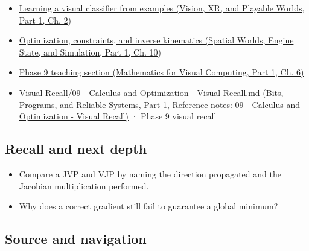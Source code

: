 \begin{itemize}
\tightlist
\item
  \href{../07-Vision-XR-and-Playable-Worlds-P01/main.pdf\#nameddest=04-visual-computing-ii-ch031-learning-a-visual-classifier-from-examples}{Learning a visual classifier from examples (Vision, XR, and Playable Worlds, Part 1, Ch. 2)}
\item
  \href{../05-Spatial-Worlds-Engine-State-and-Simulation-P01/main.pdf\#nameddest=04-visual-computing-ii-ch029-optimization-constraints-and-inverse-kinematics}{Optimization, constraints, and inverse kinematics (Spatial Worlds, Engine State, and Simulation, Part 1, Ch. 10)}
\item
  \href{../02-Mathematics-for-Visual-Computing-P01/main.pdf\#nameddest=02-foundations-ii-ch022-numerical-differentiation-and-automatic-differentiation}{Phase 9 teaching section (Mathematics for Visual Computing, Part 1, Ch. 6)}
\item
  \href{../01-Bits-Programs-and-Reliable-Systems-P01/main.pdf\#nameddest=appendix-adf48f5dc5c1}{Visual Recall/09 - Calculus and Optimization - Visual Recall.md (Bits, Programs, and Reliable Systems, Part 1, Reference notes: 09 - Calculus and Optimization - Visual Recall)} · Phase 9 visual recall
\end{itemize}

\subsection{Recall and next depth}\label{appendix-40df0855b4a7-recall-and-next-depth}

\hypertarget{appendix-40df0855b4a7-recall-and-next-depth}{}

\begin{itemize}
\tightlist
\item
  Compare a JVP and VJP by naming the direction propagated and the Jacobian multiplication performed.
\item
  Why does a correct gradient still fail to guarantee a global minimum?
\end{itemize}

\subsection{Source and navigation}\label{appendix-40df0855b4a7-source-and-navigation}

\hypertarget{appendix-40df0855b4a7-source-and-navigation}{}


